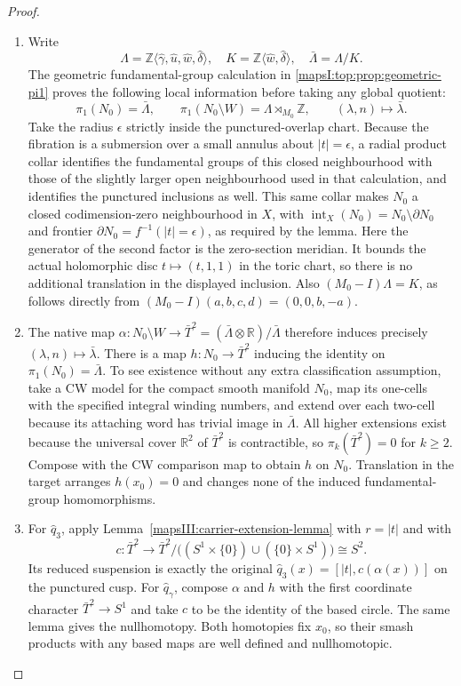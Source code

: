 \begin{proof}
\begin{enumerate}[label=\arabic*.,leftmargin=*]
\item Write
\[
 \Lambda=\mathbb Z\langle\widehat\gamma,\widehat u,
                    \widehat w,\widehat\delta\rangle,
 \quad
 K=\mathbb Z\langle\widehat w,\widehat\delta\rangle,
 \quad
 \bar\Lambda=\Lambda/K.
\]
The geometric fundamental-group calculation in
\cref{mapsI:top:prop:geometric-pi1} proves the following
local information before taking any global quotient:
\[
 \pi_1(N_0)=\bar\Lambda,\qquad
 \pi_1(N_0\setminus W)=\Lambda\rtimes_{M_0}\mathbb Z,
 \qquad
 (\lambda,n)\longmapsto\bar\lambda.
\]
Take the radius $\epsilon$ strictly inside the punctured-overlap chart.
Because the fibration is a submersion over a small annulus about
$|t|=\epsilon$, a radial product collar identifies the fundamental
groups of this closed neighbourhood with those of the slightly larger
open neighbourhood used in that calculation, and identifies the
punctured inclusions as well.  This same collar makes $N_0$ a closed
codimension-zero neighbourhood in $X$, with
$\operatorname{int}_X(N_0)=N_0\setminus\partial N_0$ and frontier
$\partial N_0=f^{-1}(|t|=\epsilon)$, as required by the lemma.
Here the generator of the second factor is the zero-section meridian.
It bounds the actual holomorphic disc
$t\mapsto(t,1,1)$ in the toric chart, so there is no additional
translation in the displayed inclusion. Also
$(M_0-I)\Lambda=K$, as follows directly from
$(M_0-I)(a,b,c,d)=(0,0,b,-a)$.

\item The native map
$\alpha:N_0\setminus W\to\bar T^2=
(\bar\Lambda\otimes\mathbb R)/\bar\Lambda$
therefore induces precisely $(\lambda,n)\mapsto\bar\lambda$.
There is a map $h:N_0\to\bar T^2$ inducing the identity on
$\pi_1(N_0)=\bar\Lambda$. To see existence without any extra
classification assumption, take a CW model for the compact smooth
manifold $N_0$, map its one-cells with the specified integral winding
numbers, and extend over each two-cell because its attaching word
has trivial image in $\bar\Lambda$. All higher extensions exist
because the universal cover $\mathbb R^2$ of $\bar T^2$ is
contractible, so $\pi_k(\bar T^2)=0$ for $k\geq2$.
Compose with the CW comparison map to obtain $h$ on $N_0$.
Translation in the target arranges $h(x_0)=0$ and changes none of
the induced fundamental-group homomorphisms.

\item For $\widehat q_3$, apply Lemma~\ref{mapsIII:carrier-extension-lemma}
with $r=|t|$ and with
\[
 c:\bar T^2\longrightarrow
 \bar T^2/\bigl((S^1\times\{0\})\cup(\{0\}\times S^1)\bigr)
 \cong S^2.
\]
Its reduced suspension is exactly the original
$\widehat q_3(x)=[|t|,c(\alpha(x))]$ on the punctured cusp.
For $\widehat q_\gamma$, compose $\alpha$ and $h$ with the first
coordinate character $\bar T^2\to S^1$ and take $c$ to be the
identity of the based circle. The same lemma gives the nullhomotopy.
Both homotopies fix $x_0$, so their smash products with any based maps
are well defined and nullhomotopic.
\end{enumerate}
\end{proof}

